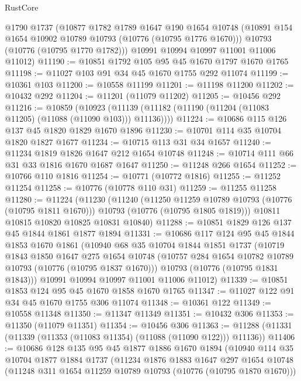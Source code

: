 \begin{lexlean}{RustCore}
\begin{coremodule}
      @1790
      @1737
      (@10877
        @1782
        @1789
        @1647
        @190
        @1654
        @10748
        (@10891 @154 @1654 @10902 @10789 @10793 (@10776 (@10795 @1776 @1670)))
        @10793
        (@10776 (@10795 @1770 @1782)))
      @10991
      @10994
      @10997
      @11001
      @11006
      @11012)
@11190 := @10851 @1792 @105 @95 @45 @1670 @1797 @1670 @1765
@11198 := @11027 @103 @91 @34 @45 @1670 @1755 @292 @11074
@11199 := @10361 @103
@11200 := @10558 @11199
@11201 := @11198 @11200
@11202 := @10432 @292
@11204 := @11201 (@11079 @11202)
@11205 := @10456 @292
@11216 := @10859
    (@10923 (@11139 (@11182 (@11190 (@11204 (@11083 @11205) (@11088 (@11090 @103))) @11136))))
@11224 := @10686 @115 @126 @137 @45 @1820 @1829 @1670 @1896
@11230 := @10701 @114 @35 @10704 @1820 @1827 @1677
@11234 := @10715 @113 @31 @34 @1657
@11240 := @11234 @1819 @1826 @1647 @212 @1654 @10748
@11248 := @10714 @111 @66 @31 @33 @1816 @1670 @1687 @1647
@11250 := @11248 @266 @1654
@11252 := @10766 @110 @1816
@11254 := @10771 (@10772 @1816)
@11255 := @11252 @11254
@11258 := @10776 (@10778 @110 @31)
@11259 := @11255 @11258
@11280 := @11224
    (@11230
      (@11240
        (@11250 @11259 @10789 @10793 (@10776 (@10795 @1811 @1670)))
        @10793
        (@10776 (@10795 @1805 @1819)))
      @10811
      @10815
      @10820
      @10825
      @10831
      @10840)
@11288 := @10851 @1829 @126 @137 @45 @1844 @1861 @1877 @1894
@11331 := @10686
    @117
    @124
    @95
    @45
    @1844
    @1853
    @1670
    @1861
    (@10940
      @68
      @35
      @10704
      @1844
      @1851
      @1737
      (@10719
        @1843
        @1850
        @1647
        @275
        @1654
        @10748
        (@10757 @284 @1654 @10782 @10789 @10793 (@10776 (@10795 @1837 @1670)))
        @10793
        (@10776 (@10795 @1831 @1843)))
      @10991
      @10994
      @10997
      @11001
      @11006
      @11012)
@11339 := @10851 @1853 @124 @95 @45 @1670 @1858 @1670 @1765
@11347 := @11027 @122 @91 @34 @45 @1670 @1755 @306 @11074
@11348 := @10361 @122
@11349 := @10558 @11348
@11350 := @11347 @11349
@11351 := @10432 @306
@11353 := @11350 (@11079 @11351)
@11354 := @10456 @306
@11363 := @11288 (@11331 (@11339 (@11353 (@11083 @11354) (@11088 (@11090 @122))) @11136))
@11406 := @10686
    @128
    @135
    @95
    @45
    @1877
    @1886
    @1670
    @1894
    (@10940
      @114
      @35
      @10704
      @1877
      @1884
      @1737
      (@11234
        @1876
        @1883
        @1647
        @297
        @1654
        @10748
        (@11248 @311 @1654 @11259 @10789 @10793 (@10776 (@10795 @1870 @1670)))

\end{coremodule}
\end{lexlean}
